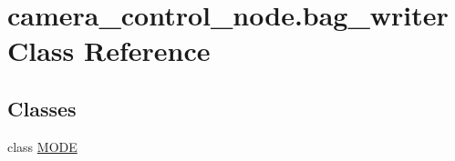 \hypertarget{classcamera__control__node_1_1bag__writer}{\section{camera\-\_\-control\-\_\-node.\-bag\-\_\-writer Class Reference}
\label{classcamera__control__node_1_1bag__writer}
}
\subsection*{Classes}
\begin{DoxyCompactItemize}
\item 
class \hyperlink{classcamera__control__node_1_1bag__writer_1_1MODE}{M\-O\-D\-E}
\end{DoxyCompactItemize}
